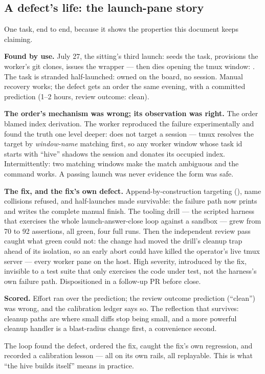 \subsection{A defect's life: the launch-pane story}

One task, end to end, because it shows the properties this document keeps claiming.

\begin{casebox}
\textbf{Found by use.} July 27, the sitting's third launch:  seeds the task, provisions the worker's git clones, issues the wrapper --- then dies opening the tmux window: . The task is stranded half-launched: owned on the board, no session. Manual recovery works; the defect gets an order the same evening, with a committed prediction (1--2 hours, review outcome: clean).

\textbf{The order's mechanism was wrong; its observation was right.} The order blamed index derivation. The worker reproduced the failure experimentally and found the truth one level deeper:  does not target a session --- tmux resolves the target by \emph{window-name} matching first, so any worker window whose task id starts with ``hive'' shadows the session and donates its occupied index. Intermittently: two matching windows make the match ambiguous and the command works. A passing launch was never evidence the form was safe.

\textbf{The fix, and the fix's own defect.} Append-by-construction targeting (), name collisions refused, and half-launches made survivable: the failure path now prints and writes the complete manual finish. The tooling drill --- the scripted harness that exercises the whole launch-answer-close loop against a sandbox --- grew from 70 to 92 assertions, all green, four full runs. Then the independent review pass caught what green could not: the change had moved the drill's cleanup trap ahead of its isolation, so an early abort could have killed the operator's live tmux server --- every worker pane on the host. High severity, introduced by the fix, invisible to a test suite that only exercises the code under test, not the harness's own failure path. Dispositioned in a follow-up PR before close.

\textbf{Scored.} Effort ran over the prediction; the review outcome prediction (``clean'') was wrong, and the calibration ledger says so. The reflection that survives: cleanup paths are where small diffs stop being small, and a more powerful cleanup handler is a blast-radius change first, a convenience second.
\end{casebox}

The loop found the defect, ordered the fix, caught the fix's own regression, and recorded a calibration lesson --- all on its own rails, all replayable. This is what ``the hive builds itself'' means in practice.

